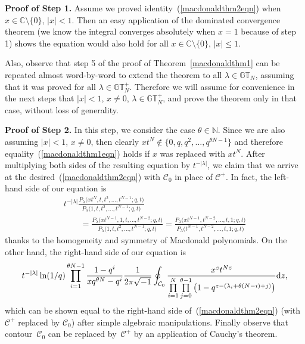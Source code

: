 \documentclass[pdftex]{sigma}
\numberwithin{equation}{section}
\newcommand{\C}{\mathbb{C}}
\newcommand{\N}{\mathbb{N}}
\newcommand{\CC}{\mathcal{C}}
\newcommand{\GT}{\mathbb{GT}}
\newcommand{\GTp}{\mathbb{GT}^+}
\begin{document}
\textbf{Proof of Step 1.} Assume we proved identity~(\ref{macdonaldthm2eqn}) when $x\in\C \setminus \{0\}$, $|x| < 1$. Then an easy application of the dominated convergence theorem (we know the integral converges absolutely when $x = 1$ because of step 1) shows the equation would also hold for all $x\in\C \setminus \{0\}$, $|x|\leq 1$.

Also, observe that step 5 of the proof of Theorem~\ref{macdonaldthm1} can be repeated almost word-by-word to extend the theorem to all $\lambda\in\GT_N$, assuming that it was proved for all $\lambda\in\GTp_N$. Therefore we will assume for convenience in the next steps that $|x| < 1$, $x\neq 0$, $\lambda\in\GTp_N$, and prove the theorem only in that case, without loss of generality.

\textbf{Proof of Step 2.} In this step, we consider the case $\theta\in\N$. Since we are also assuming $|x| < 1$, $x\neq 0$, then clearly $xt^N\notin\big\{0, q, q^2, \dots, q^{\theta N - 1}\big\}$ and therefore equality~(\ref{macdonaldthm1eqn}) holds if $x$ was replaced with $xt^N$. After multiplying both sides of the resulting equation by $t^{-|\lambda|}$, we claim that we arrive at the desired~(\ref{macdonaldthm2eqn}) with $\CC_0$ in place of $\CC^+$. In fact, the left-hand side of our equation is
\begin{gather*}
t^{-|\lambda|}\frac{P_{\lambda}\big(xt^N, t, t^2, \dots, t^{N-1}; q, t\big)}{P_{\lambda}\big(1, t, t^2, \dots, t^{N-1}; q, t\big)} \\
\qquad{} = \frac{P_{\lambda}\big(xt^{N-1}, 1, t, \dots, t^{N-2}; q, t\big)}{P_{\lambda}\big(1, t, t^2, \dots, t^{N-1}; q, t\big)} = \frac{P_{\lambda}\big(xt^{N-1}, t^{N-2}, \dots, t, 1; q, t\big)}{P_{\lambda}\big(t^{N-1}, t^{N-2}, \dots, t, 1; q, t\big)}
\end{gather*}
thanks to the homogeneity and symmetry of Macdonald polynomials. On the other hand, the right-hand side of our equation is
\begin{gather*}
t^{-|\lambda|}\ln(1/q)\prod_{i=1}^{\theta N - 1}{\frac{1 - q^i}{xq^{\theta N} - q^i}}\frac{1}{2\pi\sqrt{-1}}\oint_{\CC_0}{\frac{x^zt^{Nz}}{\prod\limits_{i=1}^N\prod\limits_{j=0}^{\theta -1}{\big(1 - q^{z - (\lambda_i + \theta(N-i) + j)}\big)}}{\rm d}z},
\end{gather*}
which can be shown equal to the right-hand side of~(\ref{macdonaldthm2eqn}) (with $\CC^+$ replaced by $\CC_0$) after simple algebraic manipulations. Finally observe that contour~$\CC_0$ can be replaced by~$\CC^+$ by an application of Cauchy's theorem.
\end{document}

